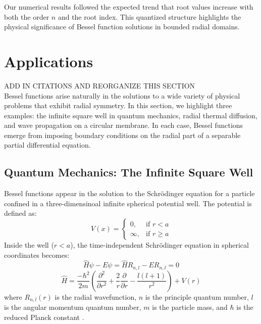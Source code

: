 \documentclass[linenumbers, twocolumn]{aastex631}
\begin{document}
\noindent Our numerical results followed the expected trend that root values
increase with both the order $n$ and the root index. This quantized structure
highlights the physical significance of Bessel function solutions in bounded
radial domains.\\


\section{Applications} \label{sec:applications}

ADD IN CITATIONS AND REORGANIZE THIS SECTION\\

Bessel functions arise naturally in the solutions to a wide variety of physical
problems that exhibit radial symmetry. In this section, we highlight three
examples: the infinite square well in quantum mechanics, radial thermal
diffusion, and wave propagation on a circular membrane. In each case, Bessel
functions emerge from imposing boundary conditions on the radial part of a 
separable partial differential equation.\\

\subsection{Quantum Mechanics: The Infinite Square Well}

Bessel functions appear in the solution to the Schrödinger equation for a
particle confined in a three-dimensinoal infinite spherical potential well.
The potential is defined as:
\begin{equation}
    V(x)=
    \begin{cases}
        0, &\text{if }r < a\\
        \infty, &\text{if }r\geq a
    \end{cases}
\end{equation}
\noindent Inside the well ($r < a$), the time-independent Schrödinger equation in
spherical coordinates becomes:
\begin{equation}
    \hat{H}\psi-E\psi=\hat{H}R_{n,l}-ER_{n,l}=0
\end{equation}
\begin{equation}
    \hat{H}=\frac{-\hbar ^2}{2m}\left(\frac{\partial^2}{\partial r^2} + \frac{2}{r} \frac{\partial}{\partial r} - \frac{l(l+1)}{r^2}\right) +V(r)
\end{equation}
\noindent where $R_{n,l}(r)$ is the radial wavefunction, $n$ is the principle
quantum number, $l$ is the angular momentum quantum number, $m$ is the
particle mass, and $\hbar$ is the reduced Planck constant \citet{hanson}.
\end{document}
